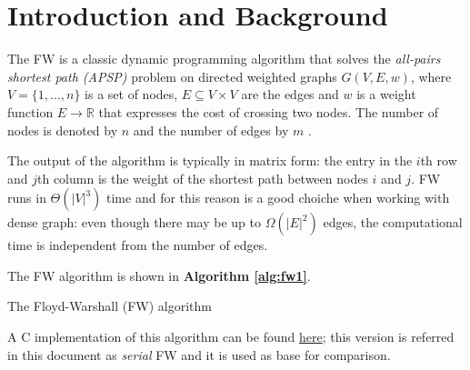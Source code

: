 \section{Introduction and Background}
The FW is a classic dynamic programming algorithm that solves the \emph{all-pairs shortest path (APSP)} problem on directed weighted
graphs $G(V, E, w)$, where $V = \{1, \dots, n\}$ is a set of nodes, $E \subseteq V \times V$ are the edges and $w$ is a weight function $E \rightarrow  \mathbb{R}$
that expresses the cost of crossing two nodes. The number of nodes is denoted by $n$ and the number of edges by $m$ . \par
The output of the algorithm is typically in matrix form: the entry in the $i$th row and $j$th column is the weight of the shortest path between
nodes $i$ and $j$. FW runs in $\Theta(|V|^3)$ time and for this reason is a good choiche when working with dense graph: even though there
may be up to $\Omega(|E|^2)$ edges, the computational time is independent from the number of edges. \par
The FW algorithm is shown in \textbf{Algorithm \ref*{alg:fw1}}.

\begin{algorithm}[h!]

\SetAlgoLined

 
\caption{The Floyd-Warshall (FW) algorithm}\label{alg:fw1}
\end{algorithm}



A C implementation of this algorithm can be found \href{https://github.com/firaja/Parallel-FloydWarshall/blob/master/sequential.c}{here};
this version is referred in this document as \emph{serial} FW and it is used as base for comparison. \par 

